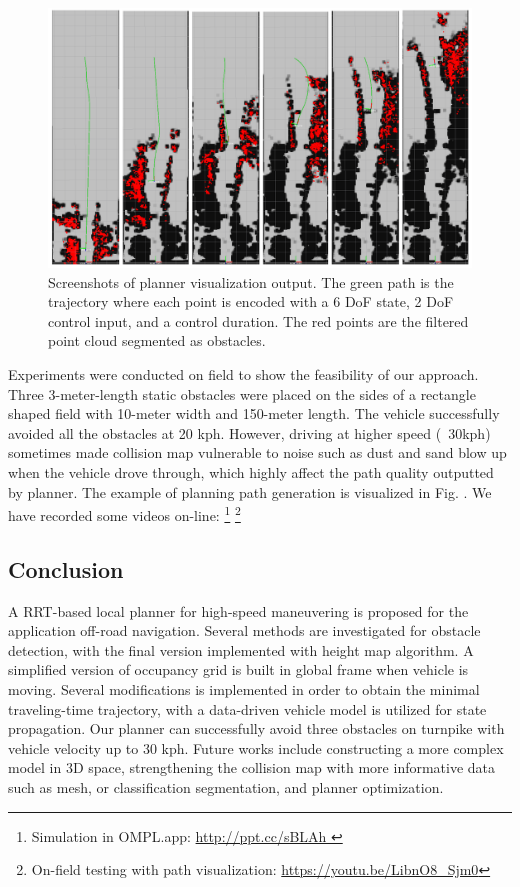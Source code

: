 \documentclass[../thesis.tex]{subfiles}
\begin{document}
\begin{figure}[t]
	\begin{center}
		\centerline{\includegraphics[width=0.8\columnwidth]{./RRTPlanner/fig/demo.png}}
		\caption{Screenshots of planner visualization output. The green path is the trajectory where each point is encoded with a 6 DoF state, 2 DoF control input, and a control duration. The red points are the filtered point cloud segmented as obstacles.}
		\label{fig:demo}
	\end{center}
\end{figure} 

Experiments were conducted on field to show the feasibility of our approach. Three 3-meter-length static obstacles were placed on the sides of a rectangle shaped field with 10-meter width and 150-meter length. The vehicle successfully avoided all the obstacles at 20 kph. However, driving at higher speed (~30kph) sometimes made collision map vulnerable to noise such as dust and sand blow up when the vehicle drove through, which highly affect the path quality outputted by planner. The example of planning path generation is visualized in Fig. . We have recorded some videos on-line: \footnote{Simulation in OMPL.app: \url{http://ppt.cc/sBLAh
}} \footnote{On-field testing with path visualization: \url{https://youtu.be/LibnO8_Sjm0}}

\subsection{Conclusion}

A RRT-based local planner for high-speed maneuvering is proposed for the application off-road navigation. Several methods are investigated for obstacle detection, with the final version implemented with height map algorithm. A simplified version of occupancy grid is built in global frame when vehicle is moving. Several modifications is implemented in order to obtain the minimal traveling-time trajectory, with a data-driven vehicle model is utilized for state propagation. Our planner can successfully avoid three obstacles on turnpike with vehicle velocity up to 30 kph. Future works include constructing a more complex model in 3D space, strengthening the collision map with more informative data such as mesh, or classification segmentation, and planner optimization. 
\end{document}
